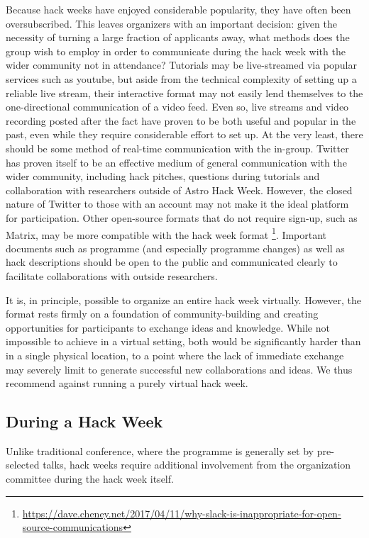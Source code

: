 \documentclass{aastex62}
\begin{document}
Because hack weeks have enjoyed considerable popularity, they have often been oversubscribed. This leaves organizers with an important decision: given the necessity of turning a large fraction of applicants away, what methods does the group wish to employ in order to communicate during the hack week with the wider community not in attendance? Tutorials may be live-streamed via popular services such as youtube, but aside from the technical complexity of setting up a reliable live stream, their interactive format may not easily lend themselves to the one-directional communication of a video feed. Even so, live streams and video recording posted after the fact have proven to be both useful and popular in the past, even while they require considerable effort to set up. At the very least, there should be some method of real-time communication with the in-group. Twitter has proven itself to be an effective medium of general communication with the wider community, including hack pitches, questions during tutorials and collaboration with researchers outside of Astro Hack Week. However, the closed nature of Twitter to those with an account may not make it the ideal platform for participation. Other open-source formats that do not require sign-up, such as Matrix, may be more compatible with the hack week format \footnote{\url{https://dave.cheney.net/2017/04/11/why-slack-is-inappropriate-for-open-source-communications}}. Important documents such as programme (and especially programme changes) as well as hack descriptions should be open to the public and communicated clearly to facilitate collaborations with outside researchers.

It is, in principle, possible to organize an entire hack week virtually. However, the format rests firmly on a foundation of community-building and creating opportunities for participants to exchange ideas and knowledge. While not impossible to achieve in a virtual setting, both would be significantly harder than in a single physical location, to a point where the lack of immediate exchange may severely limit to generate successful new collaborations and ideas. We thus recommend against running a purely virtual hack week.

\clearpage
\subsection{During a Hack Week}

Unlike traditional conference, where the programme is generally set by pre-selected talks, hack weeks require additional involvement from the organization committee during the hack week itself.
\end{document}
